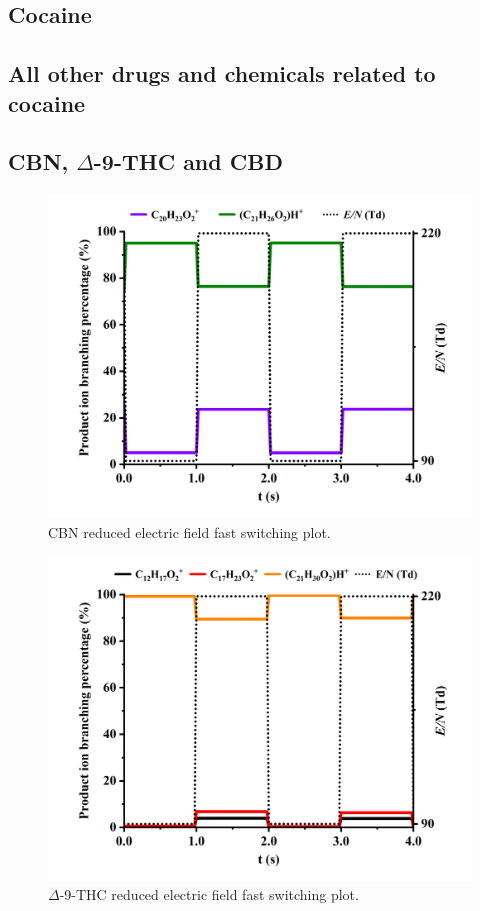 \subsection{Cocaine}

\subsection{All other drugs and chemicals related to cocaine}



\subsection{CBN, $\Delta$-9-THC and CBD}

\begin{figure}[htb]
\centering
\includegraphics[width=0.8\linewidth]{pics/other_drugs/CBN-fs-90-220.png}
\caption{CBN reduced electric field fast switching plot.}
\label{fig:DR_CBN_fs}
\end{figure}


\begin{figure}[htb]
\centering
\includegraphics[width=0.8\linewidth]{pics/other_drugs/THC-fs-90-220.png}
\caption{$\Delta$-9-THC reduced electric field fast switching plot.}
\label{fig:DR_THC_fs}
\end{figure}


